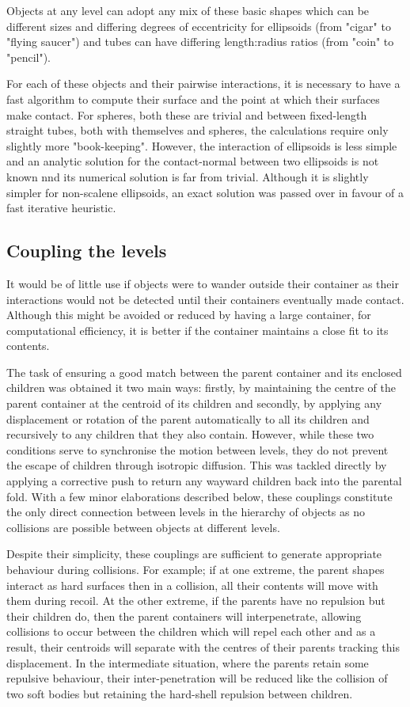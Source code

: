 Objects at any level can adopt any mix of these basic shapes which can be different 
sizes and differing degrees of eccentricity for ellipsoids (from "cigar" to "flying 
saucer") and tubes can have differing length:radius ratios (from "coin" to "pencil").

For each of these objects and their pairwise interactions, it is necessary to have 
a fast algorithm to compute their surface and the point at which their surfaces
make contact.   For spheres, both these are trivial and between fixed-length straight
tubes, both with themselves and spheres, the calculations require only slightly more
"book-keeping".    However, the interaction of ellipsoids is less simple and an analytic
solution for the contact-normal between two ellipsoids is not known nnd its numerical
solution is far from trivial.    Although it is slightly simpler for non-scalene ellipsoids,
an exact solution was passed over in favour of a fast iterative heuristic.  

\subsection{Coupling the levels}

It would be of little use if objects were to wander outside their container as their
interactions would not be detected until their containers eventually made contact.
Although this might be avoided or reduced by having a large container, for computational
efficiency, it is better if the container maintains a close fit to its contents.

The task of ensuring a good match between the parent container and its enclosed
children was obtained it two main ways: firstly, by maintaining the centre of the
parent container at the centroid of its children and secondly, by applying any
displacement or rotation of the parent automatically to all its children and recursively
to any children that they also contain.   However, while these two conditions serve
to synchronise the motion between levels, they do not prevent the escape of children
through isotropic diffusion.   This was tackled directly by applying a corrective push
to return any wayward children back into the parental fold.   With a few minor elaborations
described below, these couplings constitute the only direct connection between levels in the
hierarchy of objects as no collisions are possible between objects at different levels.

Despite their simplicity, these couplings are sufficient to generate appropriate
behaviour during collisions.   For example; if at one extreme, the parent shapes interact
as hard surfaces then in a collision, all their contents will move with them during
recoil.   At the other extreme, if the parents have no repulsion but their children do,
then the parent containers will interpenetrate, allowing collisions to occur between
the children which will repel each other and as a result, their centroids will 
separate with the centres of their parents tracking this displacement.   In the intermediate
situation, where the parents retain some repulsive behaviour, their inter-penetration
will be reduced like the collision of two soft bodies but retaining the hard-shell
repulsion between children.   

